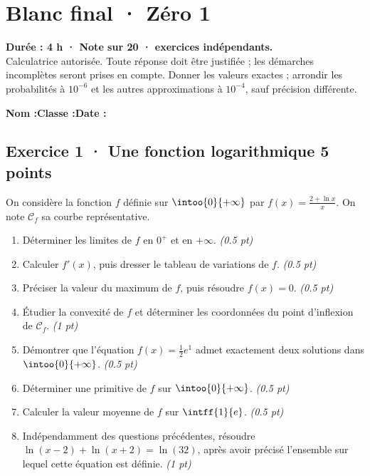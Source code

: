 \mxnewpage{}\label{sujet:9-1}

\section*{Blanc final · Zéro 1}


\textbf{Durée : 4 h · Note sur 20 ·  exercices indépendants.}\\Calculatrice autorisée. Toute réponse doit être justifiée ; les démarches incomplètes seront prises en compte. Donner les valeurs exactes ; arrondir les probabilités à $10^{-6}$ et les autres approximations à $10^{-4}$, sauf précision différente.

\smallskip\textbf{Nom :}\enspace\dotfill\quad\textbf{Classe :}\enspace\dotfill\quad\textbf{Date :}\enspace\dotfill

\subsection*{Exercice 1 · Une fonction logarithmique \hfill 5 points}On considère la fonction $f$ définie sur $\intoo{0}{+\infty}$ par $f(x)=\frac{2+\ln x}x$. On note $\mathcal C_f$ sa courbe représentative.

\begin{enumerate}

\item Déterminer les limites de $f$ en $0^+$ et en $+\infty$. \hfill\textit{(\num{0,5} pt)}

\item Calculer $f' (x)$, puis dresser le tableau de variations de $f$. \hfill\textit{(\num{0,5} pt)}

\item Préciser la valeur du maximum de $f$, puis résoudre $f(x)=0$. \hfill\textit{(\num{0,5} pt)}

\item Étudier la convexité de $f$ et déterminer les coordonnées du point d'inflexion de $\mathcal C_f$. \hfill\textit{(1 pt)}

\item Démontrer que l'équation $f(x)=\frac12 e^{1}$ admet exactement deux solutions dans $\intoo{0}{+\infty}$. \hfill\textit{(\num{0,5} pt)}

\item Déterminer une primitive de $f$ sur $\intoo{0}{+\infty}$. \hfill\textit{(\num{0,5} pt)}

\item Calculer la valeur moyenne de $f$ sur $\intff{1}{e}$. \hfill\textit{(\num{0,5} pt)}

\item Indépendamment des questions précédentes, résoudre $\ln(x-2)+\ln(x+2)=\ln(32)$, après avoir précisé l'ensemble sur lequel cette équation est définie. \hfill\textit{(1 pt)}

\end{enumerate}

